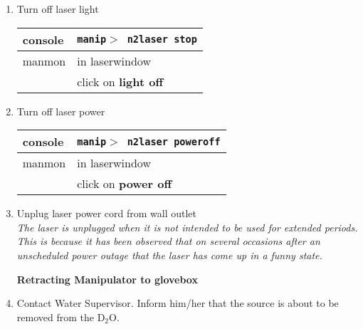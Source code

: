 \begin{enumerate}
 \item\checkbox Turn off laser light
  \begin{center}
  \begin{tabular}{|l|l|}
  \hline
  console & {\tt manip$>$ n2laser stop} \\
  \hline
  manmon  & in laserwindow \\
          & click on {\bf light off}\\
  \hline
  \end{tabular}
  \end{center}
 \item\checkbox Turn off laser power
  \begin{center}
  \begin{tabular}{|l|l|}
  \hline
  console & {\tt manip$>$ n2laser poweroff} \\
  \hline
  manmon  & in laserwindow \\
          & click on {\bf power off}\\
  \hline
  \end{tabular}
  \end{center}
 \item\checkbox Unplug laser power cord from wall outlet\\
  \small
  {\em
    The laser is unplugged when it is not intended to be used for
    extended periods.  This is because it has been observed that
    on several occasions after an unscheduled power outage that the
    laser has come up in a funny state.
  }
  \normalsize
  


\begin{center}
                   {\bf Retracting Manipulator to glovebox}
\end{center}

\item\checkbox Contact Water Supervisor.  Inform him/her that the source is
   about to be removed from the D$_2$O. 


\end{enumerate}
